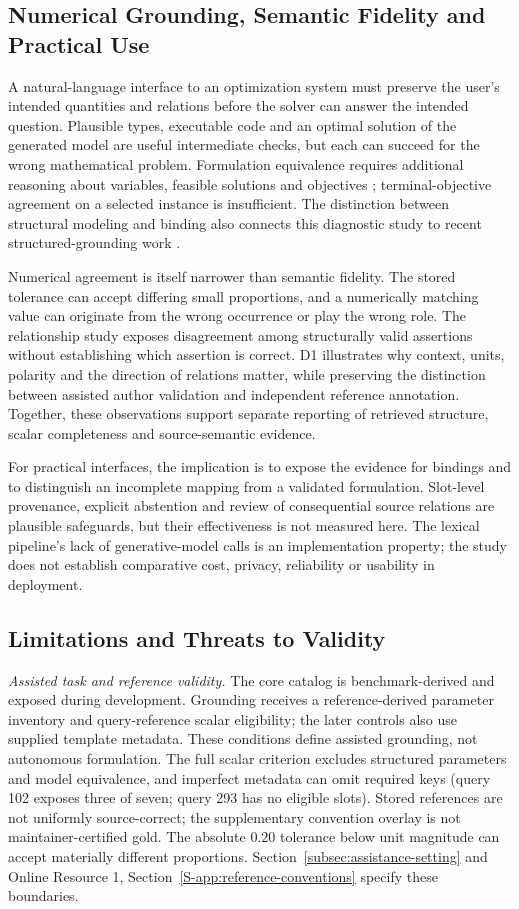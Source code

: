 \documentclass[pdflatex,iicol,sn-basic,Numbered]{sn-jnl}
\begin{document}
\subsection{Numerical Grounding, Semantic Fidelity and Practical Use}
A natural-language interface to an optimization system must preserve the user's intended quantities and relations before the solver can answer the intended question. Plausible types, executable code and an optimal solution of the generated model are useful intermediate checks, but each can succeed for the wrong mathematical problem. Formulation equivalence requires additional reasoning about variables, feasible solutions and objectives \cite{zhai2025equivamap}; terminal-objective agreement on a selected instance is insufficient. The distinction between structural modeling and binding also connects this diagnostic study to recent structured-grounding work \cite{gao2026models}.

Numerical agreement is itself narrower than semantic fidelity. The stored tolerance can accept differing small proportions, and a numerically matching value can originate from the wrong occurrence or play the wrong role. The relationship study exposes disagreement among structurally valid assertions without establishing which assertion is correct. D1 illustrates why context, units, polarity and the direction of relations matter, while preserving the distinction between assisted author validation and independent reference annotation. Together, these observations support separate reporting of retrieved structure, scalar completeness and source-semantic evidence.

For practical interfaces, the implication is to expose the evidence for bindings and to distinguish an incomplete mapping from a validated formulation. Slot-level provenance, explicit abstention and review of consequential source relations are plausible safeguards, but their effectiveness is not measured here. The lexical pipeline's lack of generative-model calls is an implementation property; the study does not establish comparative cost, privacy, reliability or usability in deployment.

\subsection{Limitations and Threats to Validity}
\label{subsec:limitations}
\emph{Assisted task and reference validity.} The core catalog is benchmark-derived and exposed during development. Grounding receives a reference-derived parameter inventory and query-reference scalar eligibility; the later controls also use supplied template metadata. These conditions define assisted grounding, not autonomous formulation. The full scalar criterion excludes structured parameters and model equivalence, and imperfect metadata can omit required keys (query 102 exposes three of seven; query 293 has no eligible slots). Stored references are not uniformly source-correct; the supplementary convention overlay is not maintainer-certified gold. The absolute $0.20$ tolerance below unit magnitude can accept materially different proportions. Section~\ref{subsec:assistance-setting} and Online Resource 1, Section~\ref{S-app:reference-conventions} specify these boundaries.
\end{document}
